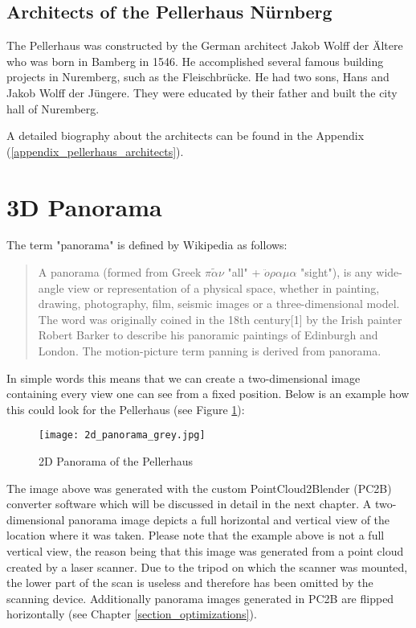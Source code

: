 \subsection{Architects of the Pellerhaus Nürnberg}

The Pellerhaus was constructed by the German architect Jakob Wolff der Ältere who was born in Bamberg in 1546. He accomplished several famous building projects in Nuremberg, such as the Fleischbrücke. He had two sons, Hans and Jakob Wolff der Jüngere. They were educated by their father and built the city hall of Nuremberg.

A detailed biography about the architects can be found in the Appendix (\ref{appendix_pellerhaus_architects}).

\section{3D Panorama}

The term "panorama" is defined by Wikipedia \parencite{wiki:Panorama} as follows:


\blockquote{
	A panorama (formed from Greek {$\pi\tilde{\alpha}\nu $} "all" + {$\ddot{o}\rho\alpha\mu\alpha$} "sight"), is any wide-angle view or representation of a physical space, whether in painting, drawing, photography, film, seismic images or a three-dimensional model. The word was originally coined in the 18th century[1] by the Irish painter Robert Barker to describe his panoramic paintings of Edinburgh and London. The motion-picture term panning is derived from panorama.
}

In simple words this means that we can create a two-dimensional image containing every view one can see from a fixed position. Below is an example how this could look for the Pellerhaus (see Figure \ref{fig:2d_panorama}):

\pagebreak

\begin{figure}[h]
	\centering
	\texttt{[image: 2d\_panorama\_grey.jpg]}
	\caption{2D Panorama of the Pellerhaus}
	\label{fig:2d_panorama}
\end{figure}

The image above was generated with the custom PointCloud2Blender (PC2B) converter software which will be discussed in detail in the next chapter. A two-dimensional panorama image depicts a full horizontal and vertical view of the location where it was taken. Please note that the example above is not a full vertical view, the reason being that this image was generated from a point cloud created by a laser scanner. Due to the tripod on which the scanner was mounted, the lower part of the scan is useless and therefore has been omitted by the scanning device. Additionally panorama images generated in PC2B are flipped horizontally (see Chapter \ref{section_optimizations}).

